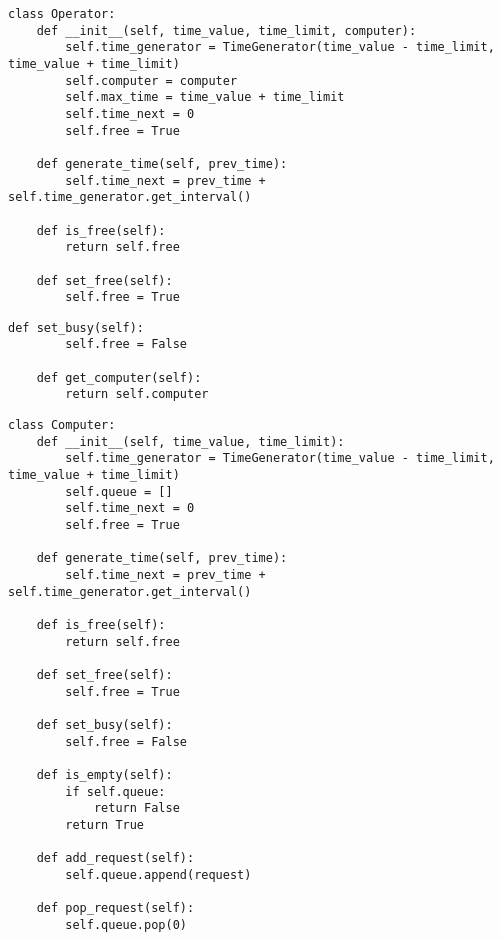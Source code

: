 \begin{center}
\captionsetup{justification=raggedright,singlelinecheck=off}
\begin{lstlisting}[label=lst:operator-1,caption=Реализация работы оператора (часть 1)]
class Operator:
    def __init__(self, time_value, time_limit, computer):
        self.time_generator = TimeGenerator(time_value - time_limit, time_value + time_limit)
        self.computer = computer
        self.max_time = time_value + time_limit
        self.time_next = 0
        self.free = True

    def generate_time(self, prev_time):
        self.time_next = prev_time + self.time_generator.get_interval()

    def is_free(self):
        return self.free

    def set_free(self):
        self.free = True
\end{lstlisting}
\end{center}

\begin{center}
\captionsetup{justification=raggedright,singlelinecheck=off}
\begin{lstlisting}[label=lst:operator-2,caption=Реализация работы оператора (часть 2)]
    def set_busy(self):
        self.free = False

    def get_computer(self):
        return self.computer
\end{lstlisting}
\end{center}


\begin{center}
\captionsetup{justification=raggedright,singlelinecheck=off}
\begin{lstlisting}[label=lst:computer,caption=Реализация работы компьютера]
class Computer:
    def __init__(self, time_value, time_limit):
        self.time_generator = TimeGenerator(time_value - time_limit, time_value + time_limit)
        self.queue = []
        self.time_next = 0
        self.free = True

    def generate_time(self, prev_time):
        self.time_next = prev_time + self.time_generator.get_interval()

    def is_free(self):
        return self.free

    def set_free(self):
        self.free = True

    def set_busy(self):
        self.free = False

    def is_empty(self):
        if self.queue:
            return False
        return True

    def add_request(self):
        self.queue.append(request)

    def pop_request(self):
        self.queue.pop(0)
\end{lstlisting}
\end{center}


